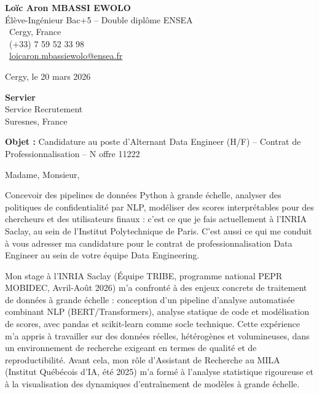 \documentclass[a4paper,11pt]{article}
\begin{document}
\noindent
\begin{minipage}[t]{0.5\textwidth}
    \textbf{Loïc Aron MBASSI EWOLO}\\
    Élève-Ingénieur Bac+5 -- Double diplôme ENSEA\\[3pt]
    \faMapMarker\ Cergy, France\\
    \faPhone\ (+33) 7 59 52 33 98\\
    \faEnvelope\ \href{mailto:loicaron.mbassiewolo@ensea.fr}{loicaron.mbassiewolo@ensea.fr}
\end{minipage}
\hfill
\begin{minipage}[t]{0.4\textwidth}
    \raggedleft
    Cergy, le 20 mars 2026
\end{minipage}

\vspace{1.2cm}

\hfill
\begin{minipage}[t]{0.5\textwidth}
    \raggedleft
    \textbf{Servier}\\
    Service Recrutement\\
    Suresnes, France
\end{minipage}

\vspace{1cm}

\noindent\textbf{Objet :} Candidature au poste d'Alternant Data Engineer (H/F) -- Contrat de Professionnalisation -- N\textdegree{} offre 11222

\vspace{0.8cm}

Madame, Monsieur,

Concevoir des pipelines de données Python à grande échelle, analyser des politiques de confidentialité par NLP, modéliser des scores interprétables pour des chercheurs et des utilisateurs finaux : c'est ce que je fais actuellement à l'INRIA Saclay, au sein de l'Institut Polytechnique de Paris. C'est aussi ce qui me conduit à vous adresser ma candidature pour le contrat de professionnalisation Data Engineer au sein de votre équipe Data Engineering.

Mon stage à l'INRIA Saclay (Équipe TRIBE, programme national PEPR MOBIDEC, Avril-Août 2026) m'a confronté à des enjeux concrets de traitement de données à grande échelle : conception d'un pipeline d'analyse automatisée combinant NLP (BERT/Transformers), analyse statique de code et modélisation de scores, avec pandas et scikit-learn comme socle technique. Cette expérience m'a appris à travailler sur des données réelles, hétérogènes et volumineuses, dans un environnement de recherche exigeant en termes de qualité et de reproductibilité. Avant cela, mon rôle d'Assistant de Recherche au MILA (Institut Québécois d'IA, été 2025) m'a formé à l'analyse statistique rigoureuse et à la visualisation des dynamiques d'entraînement de modèles à grande échelle.
\end{document}
